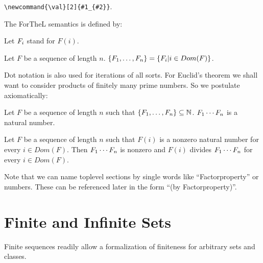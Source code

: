 \documentclass[11pt]{article}
\begin{document}
\verb+\newcommand{\val}[2]{#1_{#2}}+.

\noindent The ForTheL semantics is defined by:

\begin{forthel}
Let $\val{F}{i}$ stand for $F(i)$.

\begin{definition} Let $F$ be a sequence of length $n$.
$\Set{F}{1}{n} = \{ \val{F}{i} | i \in Dom(F)\}$.
\end{definition}

\end{forthel}

Dot notation is also used for iterations of all sorts.
For Euclid's theorem we shall want to consider products
of finitely many prime numbers. So we postulate
axiomatically:

\begin{forthel}



\begin{signature} Let $F$ be a sequence of length $n$
such that $\{F_{1},\dots,F_{n}\} \subseteq \mathbb{N}$.
$F_{1} \cdots F_{n}$ is a natural number.
\end{signature}

\begin{axiom}[Factorproperty] Let $F$ be a sequence of length $n$
such that $F(i)$ is a nonzero natural number for every $i \in Dom(F)$.
Then $F_{1} \cdots F_{n}$ is nonzero and 
$F(i)$ divides $F_{1} \cdots F_{n}$ for every $i \in Dom(F)$.
\end{axiom}


\end{forthel}

Note that we can name toplevel sections by single words like ``Factorproperty''
or numbers. These can be referenced later in the form ``(by Factorproperty)''.

\section{Finite and Infinite Sets}

Finite sequences readily allow a formalization
of finiteness for arbitrary sets and classes.
\end{document}
